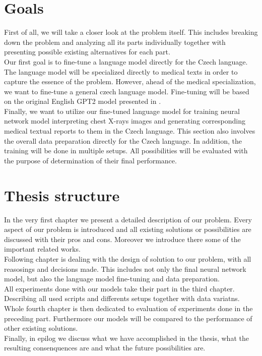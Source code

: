 \section*{Goals}
First of all, we will take a closer look at the problem itself. This includes breaking down the problem and analyzing all its parts individually together with presenting possible existing alternatives for each part. \\

Our first goal is to fine-tune a language model directly for the Czech language. The language model will be specialized directly to medical texts in order to capture the essence of the problem. However, ahead of the medical specialization, we want to fine-tune a general czech language model. Fine-tuning will be based on the original English GPT2 model presented in \citet{radford2019language}.\\

Finally, we want to utilize our fine-tuned language model for training neural network model interpreting chest X-rays images and generating corresponding medical textual reports to them in the Czech language. This section also involves the overall data preparation directly for the Czech language. In addition, the training will be done in multiple setups. All possibilities will be evaluated with the purpose of determination of their final performance.\\

\section*{Thesis structure}

In the very first chapter we present a detailed description of our problem. Every aspect of our problem is introduced and all existing solutions or possibilities are discussed with their pros and cons. Moreover we introduce there some of the important related works.\\

Following chapter is dealing with the design of solution to our problem, with all reasosings and decisions made. This includes not only the final neural network model, but also the language model fine-tuning and data preparation.\\

All experiments done with our models take their part in the third chapter. Describing all used scripts and differents setups together with data variatns.\\

Whole fourth chapter is then dedicated to evaluation of experiments done in the preceding part. Furthermore our models will be compared to the performance of other existing solutions.\\

Finally, in epilog we discuss what we have accomplished in the thesis, what the resulting consenquences are and what the future possibilities are.